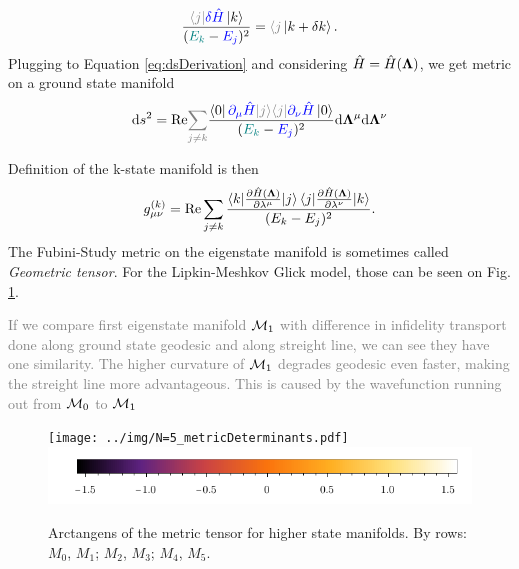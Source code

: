 \begin{equation}
    \frac{\textcolor{gray}{\bra{j}}\textcolor{blue}{\delta \HH}\ket{k}}{(\textcolor{teal}{E_k}-\textcolor{blue}{E_j})^2}=\textcolor{gray}{\langle j}\ket{k+\delta k}.
    \label{eq:braket_k,deltaj}
\end{equation}
Plugging to Equation \ref{eq:dsDerivation} and considering $\hat{H}=\hat{H}({\bm\Lambda})$, we get metric on a ground state manifold
\begin{equation}
    \d s^2 = \Re\textcolor{gray}{\sum_{j\neq k}} \frac{\bra{0}\textcolor{blue}{\partial_\mu \HH \textcolor{gray}{\ket{j}}}\textcolor{gray}{\bra{j}}\textcolor{blue}{\partial_\nu \HH}\ket{0}}{(\textcolor{teal}{E_k}-\textcolor{blue}{E_j})^2}  \d \llambda^\mu\d \llambda^\nu
    \label{eq:distanceonM}
\end{equation}


Definition of the k-state manifold is then
\begin{equation}
    g_{\mu\nu}^{(k)} = \text{Re} \sum_{j\neq k}\frac{\braket{k|\frac{\partial \hat{H}({\bm\Lambda})}{\partial \lambda^\mu}|j}\braket{j|\frac{\partial \hat{H}({\bm\Lambda})}{\partial \lambda^\nu}|k}}{(E_k-E_j)^2}.
    \label{eq:metrictensork}
\end{equation}
The Fubini-Study metric on the eigenstate manifold is sometimes called \emph{Geometric tensor}. For the Lipkin-Meshkov Glick model, those can be seen on Fig. \ref{fig:higherStateManifolds}.


\textcolor{gray}{If we compare first eigenstate manifold $\mathcal{M}_1$ with difference in infidelity transport done along ground state geodesic and along streight line, we can see they have one similarity. The higher curvature of $\mathcal{M}_1$ degrades geodesic even faster, making the streight line more advantageous. This is caused by the wavefunction running out from $\mathcal{M}_0$ to $\mathcal{M}_1$}




\begin{figure}[H]
    \centering
    \texttt{[image: ../img/N=5\_metricDeterminants.pdf]}
    \includegraphics[scale=1.2]{../img/N=3_barA.pdf}
    \caption{Arctangens of the metric tensor for higher state manifolds. By  rows: $M_0$, $M_1$; $M_2$, $M_3$; $M_4$, $M_5$.}
    \label{fig:higherStateManifolds}    
\end{figure}


